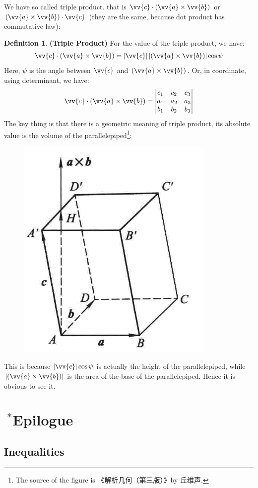 \documentclass[12pt, a4paper, reqno]{amsart}
\theoremstyle{definition}
\newtheorem{definition}[theorem]{Definition} %
\numberwithin{equation}{section} %
\begin{document}
We have so called triple product. that is $\vv{c}\cdot (\vv{a}\times\vv{b})$ or $(\vv{a}\times\vv{b})\cdot \vv{c}$ (they are the same, because dot product has commutative law):
\begin{definition}\label{D:TP} \textbf{(Triple Product)}\hfill
	For the value of the triple product, we have:
	\begin{equation}
		\vv{c}\cdot (\vv{a}\times\vv{b}) = \left|\vv{c}\right|\left|(\vv{a}\times\vv{b})\right|\cos \psi
	\end{equation}
	Here, $\psi$ is the angle between $\vv{c}$ and $(\vv{a}\times\vv{b})$. Or, in coordinate, using determinant, we have:
	\begin{equation}
		\vv{c}\cdot (\vv{a}\times\vv{b}) =
		\begin{vmatrix}
			c_1 & c_2 & c_3\\
			a_1 & a_2 & a_3\\
			b_1 & b_2 & b_3
		\end{vmatrix}
	\end{equation}
	The key thing is that there is a geometric meaning of triple product, its absolute value is the volume of the parallelepiped\footnote{The source of the figure is 《解析几何（第三版）》by 丘维声.}\label{f:Parallelepiped}:
	\begin{figure}[h]
		\centering\includegraphics[width=.2\linewidth]{15.png}
		\caption{}
	\end{figure}
	
	This is because $\left|\vv{c}\right|\cos \psi$ is actually the height of the parallelepiped, while $\left|(\vv{a}\times\vv{b})\right|$ is the area of the base of the parallelepiped. Hence it is obvious to see it.
\end{definition}

\newpage
\section{$\ ^\ast$Epilogue}\label{S:EPI}

\subsection{Inequalities}\label{SS:INEQ}\hfill
\end{document}
